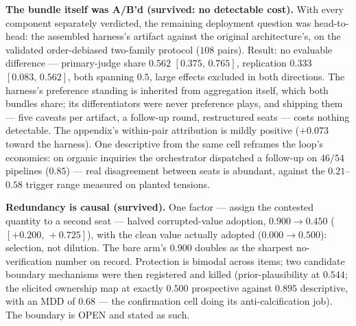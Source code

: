 \documentclass[11pt]{article}
\newcommand{\ci}[2]{\ensuremath{[#1,\,#2]}}
\begin{document}
\textbf{The bundle itself was A/B'd (survived: no detectable cost).}
With every component separately verdicted, the remaining deployment
question was head-to-head: the assembled harness's artifact against
the original architecture's, on the validated order-debiased
two-family protocol ($108$ pairs). Result: no evaluable difference ---
primary-judge share $0.562$ \ci{0.375}{0.765}, replication $0.333$
\ci{0.083}{0.562}, both spanning $0.5$, large effects excluded in both
directions. The harness's preference standing is inherited from
aggregation itself, which both bundles share; its differentiators were
never preference plays, and shipping them --- five caveats per
artifact, a follow-up round, restructured seats --- costs nothing
detectable. The appendix's within-pair attribution is mildly positive
($+0.073$ toward the harness). One descriptive from the same cell
reframes the loop's economics: on organic inquiries the orchestrator
dispatched a follow-up on $46/54$ pipelines ($0.85$) --- real
disagreement between seats is abundant, against the $0.21$--$0.58$
trigger range measured on planted tensions.

\textbf{Redundancy is causal (survived).} One factor --- assign the
contested quantity to a second seat --- halved corrupted-value
adoption, $0.900\to0.450$ (\ci{+0.200}{+0.725}), with the clean value
actually adopted ($0.000\to0.500$): selection, not dilution. The bare
arm's $0.900$ doubles as the sharpest no-verification number on
record. Protection is bimodal across items; two candidate boundary
mechanisms were then registered and killed (prior-plausibility at
$0.544$; the elicited ownership map at exactly $0.500$ prospective
against $0.895$ descriptive, with an MDD of $0.68$ --- the
confirmation cell doing its anti-calcification job). The boundary is
OPEN and stated as such.
\end{document}
